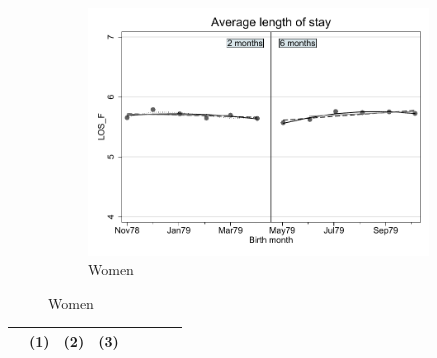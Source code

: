 \documentclass[a4paper ]{article}
\begin{document}
\begin{figure}[h]
\begin{subfigure}[t]{0.31\textwidth}
		\centering
		\includegraphics[width=0.99\textwidth]{R1_RD_LOS_F_fits}
		\caption{Women}
	\end{subfigure}
\end{figure}


\begin{table}[h]\centering
\def\sym#1{\ifmmode^{#1}\else\(^{#1}\)\fi}
\begin{tabular}{l*{3}{c}|cccc}
\toprule
 &\multicolumn{1}{c}{(1)}&\multicolumn{1}{c}{(2)}&\multicolumn{1}{c}{(3)}\\  
\midrule 

\bottomrule
\end{tabular}
\end{table}
\end{document}
